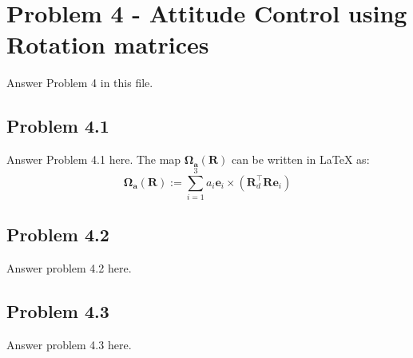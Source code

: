\section*{Problem 4 - Attitude Control using Rotation matrices}
 Answer Problem 4 in this file.
 
\subsection*{Problem 4.1}
Answer Problem 4.1 here. The map $\boldsymbol{\Omega}_{\mathbf{a}}(\mathbf{R})$ can be written in \LaTeX{} as:
\begin{equation}
\boldsymbol{\Omega}_{\mathbf{a}}(\mathbf{R}) := \sum \limits_{i=1}^3 a_i \mathbf{e}_i \times (\mathbf{R}_d^{\top} \mathbf{R} \mathbf{e}_i)
\end{equation} 

\subsection*{Problem 4.2}
Answer problem 4.2 here.

\subsection*{Problem 4.3}
Answer problem 4.3 here.